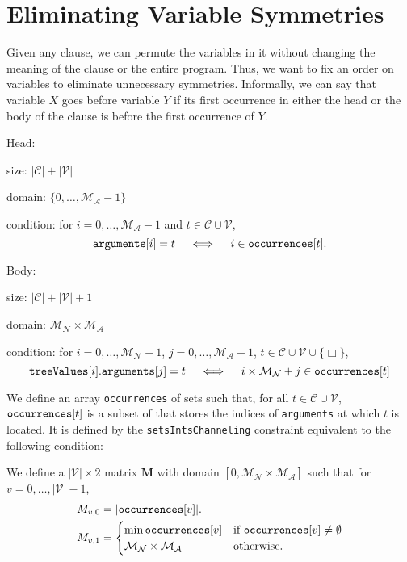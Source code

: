 \documentclass[runningheads]{llncs}
\newcommand{\variable}[1]{\texttt{\textup{#1}}}
\newcommand{\variables}{\mathcal{V}}
\newcommand{\constants}{\mathcal{C}}
\newcommand{\maxArity}{\mathcal{M}_{\mathcal{A}}}
\newcommand{\maxNumNodes}{\mathcal{M}_{\mathcal{N}}}
\begin{document}
\section{Eliminating Variable Symmetries} \label{sec:variable_symmetry}

Given any clause, we can permute the variables in it without changing the
meaning of the clause or the entire program. Thus, we want to fix an order on
variables to eliminate unnecessary symmetries. Informally, we can say that
variable $X$ goes before variable $Y$ if its first occurrence in either the head
or the body of the clause is before the first occurrence of $Y$.

\begin{definition}
  Head:

  size: $|\constants{}| + |\variables{}|$

  domain: $\{ 0, \dots, \maxArity{} - 1\}$

  condition: for $i = 0, \dots, \maxArity{} - 1$ and $t \in \constants{} \cup \variables{}$,
  \[
    \variable{arguments}[i] = t \quad \iff \quad i \in \variable{occurrences}[t].
  \]

  Body:

  size: $|\constants{}| + |\variables{}| + 1$

  domain: $\maxNumNodes{} \times \maxArity{}$

  condition: for $i = 0, \dots, \maxNumNodes{} - 1$, $j = 0, \dots, \maxArity{}
  - 1$, $t \in \constants{} \cup \variables{} \cup \{ \Box \}$,
  \[
    \variable{treeValues}[i].\variable{arguments}[j] = t \quad \iff \quad i
    \times \maxNumNodes{} + j \in \variable{occurrences}[t]
  \]

  We define an array \variable{occurrences} of  sets such that, for all $t \in
  \constants{} \cup \variables{}$, $\variable{occurrences}[t]$ is a subset of
  that stores the indices of \variable{arguments} at which $t$ is located. It is
  defined by the \variable{setsIntsChanneling} constraint equivalent to the
  following condition:
\end{definition}

\begin{definition}
  We define a $|\variables{}| \times 2$ matrix $\mathbf{M}$ with domain $[0,
  \maxNumNodes{} \times \maxArity{}]$ such that for $v = 0, \dots, |\variables{}| - 1$,
  \begin{align*}
    M_{v,0} &= |\variable{occurrences}[v]|.\\
    M_{v,1} &= \begin{cases}
      \min \variable{occurrences}[v] & \text{if } \variable{occurrences}[v] \ne \emptyset\\
      \maxNumNodes{} \times \maxArity{} & \text{otherwise.}
    \end{cases}
  \end{align*}
\end{definition}
\end{document}
